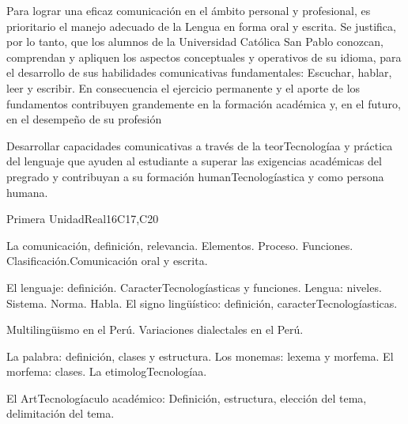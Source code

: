 \begin{syllabus}


\begin{justification}
Para lograr una eficaz comunicación en el ámbito personal y profesional, es prioritario el manejo adecuado de la Lengua en forma oral y escrita. Se justifica, por lo tanto, que los alumnos de la Universidad Católica San Pablo conozcan, comprendan y apliquen los aspectos conceptuales y operativos de su idioma, para el desarrollo de sus habilidades comunicativas fundamentales: Escuchar, hablar, leer y escribir.
En consecuencia el ejercicio permanente y el aporte de los fundamentos contribuyen grandemente en la formación académica y, en el futuro, en el desempeño de su profesión
\end{justification}

\begin{goals}
\item Desarrollar capacidades comunicativas a través de la teorTecnologíaa y práctica del lenguaje que ayuden al estudiante a superar las exigencias académicas del pregrado y contribuyan a su formación humanTecnologíastica y como persona humana.
\end{goals}

\begin{outcomes}
   \item {}
   \item {}
   \item {}
\end{outcomes}

\begin{competences}
    \item {}
    \item {}
    \item {}
\end{competences}

\begin{unit}{}{Primera Unidad}{Real}{16}{C17,C20}
\begin{topics}
      \item La comunicación, definición, relevancia. Elementos. Proceso. Funciones. Clasificación.Comunicación oral y escrita.
      \item El lenguaje: definición. CaracterTecnologíasticas y funciones. Lengua: niveles. Sistema. Norma. Habla. El signo lingüístico: definición, caracterTecnologíasticas.
      \item Multilingüismo en el Perú. Variaciones dialectales en el Perú.
      \item La palabra: definición, clases y estructura. Los monemas: lexema y morfema. El morfema: clases. La etimologTecnologíaa.
      \item El ArtTecnologíaculo académico: Definición, estructura, elección del tema, delimitación del tema.
\end{topics}


\end{unit}
\end{syllabus}
